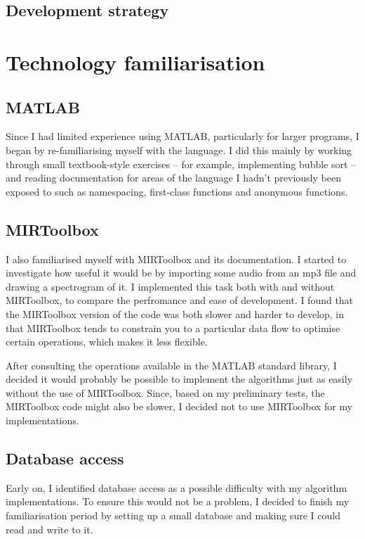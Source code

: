 \documentclass[12pt,a4paper,twoside,openright]{report}
\begin{document}
\subsection{Development strategy}



\section{Technology familiarisation}

\subsection{MATLAB}

Since I had limited experience using MATLAB, particularly for larger programs, I began by re-familiarising myself with the language. I did this mainly by working through small textbook-style exercises -- for example, implementing bubble sort -- and reading documentation for areas of the language I hadn't previously been exposed to such as namespacing, first-class functions and anonymous functions.

\subsection{MIRToolbox}

I also familiarised myself with MIRToolbox and its documentation. I started to investigate how useful it would be by importing some audio from an mp3 file and drawing a spectrogram of it. I implemented this task both with and without MIRToolbox, to compare the perfromance and ease of development. I found that the MIRToolbox version of the code was both slower and harder to develop, in that MIRToolbox tends to constrain you to a particular data flow to optimise certain operations, which makes it less flexible.

After consulting the operations available in the MATLAB standard library, I decided it would probably be possible to implement the algorithms just as easily without the use of MIRToolbox. Since, based on my preliminary tests, the MIRToolbox code might also be slower, I decided not to use MIRToolbox for my implementations.

\subsection{Database access}

Early on, I identified database access as a possible difficulty with my algorithm implementations. To ensure this would not be a problem, I decided to finish my familiarisation period by setting up a small database and making sure I could read and write to it.
\end{document}
